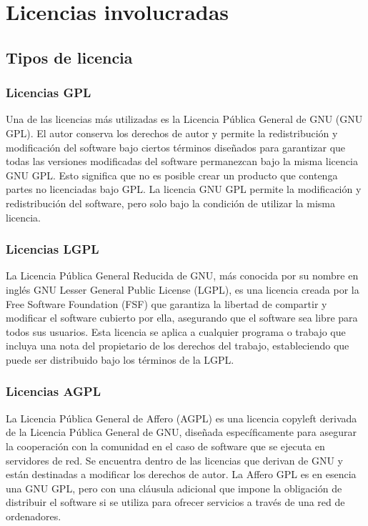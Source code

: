 	\chapter{Licencias involucradas}\label{ch:licencias}

	\section{Tipos de licencia}\vspace{0.6cm}

			\subsection{Licencias GPL}\label{gpl}
			
				Una de las licencias más utilizadas es la Licencia Pública General de GNU (GNU GPL). El autor conserva los derechos de autor y permite la redistribución y modificación del software bajo ciertos términos diseñados para garantizar que todas las versiones modificadas del software permanezcan bajo la misma licencia GNU GPL. Esto significa que no es posible crear un producto que contenga partes no licenciadas bajo GPL. La licencia GNU GPL permite la modificación y redistribución del software, pero solo bajo la condición de utilizar la misma licencia.\par
				
	
	
			\subsection{Licencias LGPL}\label{lgpl}
				
				La Licencia Pública General Reducida de GNU, más conocida por su nombre en inglés GNU Lesser General Public License (LGPL), es una licencia creada por la Free Software Foundation (FSF) que garantiza la libertad de compartir y modificar el software cubierto por ella, asegurando que el software sea libre para todos sus usuarios. Esta licencia se aplica a cualquier programa o trabajo que incluya una nota del propietario de los derechos del trabajo, estableciendo que puede ser distribuido bajo los términos de la LGPL.\par
			
			\subsection{Licencias AGPL}\label{agpl}
			
				La Licencia Pública General de Affero (AGPL) es una licencia copyleft derivada de la Licencia Pública General de GNU, diseñada específicamente para asegurar la cooperación con la comunidad en el caso de software que se ejecuta en servidores de red. Se encuentra dentro de las licencias que derivan de GNU y están destinadas a modificar los derechos de autor. La Affero GPL es en esencia una GNU GPL, pero con una cláusula adicional que impone la obligación de distribuir el software si se utiliza para ofrecer servicios a través de una red de ordenadores.

